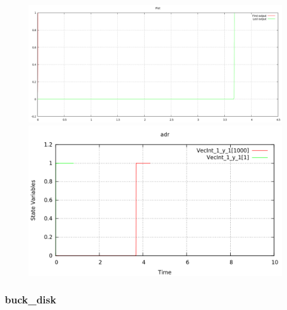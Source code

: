 \documentclass[a4paper,	11pt]{report}
\begin{document}
\begin{figure}[H]
\centering
\begin{minipage}{0.5\textwidth}
\centering
 \includegraphics[width=\linewidth]{adr-pd}
\end{minipage}\hfill
\begin{minipage}{0.5\textwidth}
\centering
 \includegraphics[width=\linewidth]{adr-qss}
\end{minipage}
\end{figure}

\subsubsection{buck\_disk}
\end{document}
